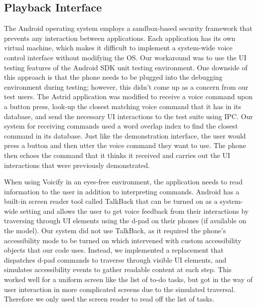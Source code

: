 \documentclass[letterpaper]{article}
\begin{document}
\subsection{Playback Interface}
The Android operating system employs a sandbox-based security framework that prevents any interaction between applications.
Each application has its own virtual machine, which makes it difficult to implement a system-wide voice control interface without modifying the OS.
Our workaround was to use the UI testing features of the Android SDK unit testing environment.
One downside of this approach is that the phone needs to be plugged into the debugging environment during testing; however, 
this didn't come up as a concern from our test users. The Astrid application was modified to receive a voice command upon a button press, look-up the closest matching voice command that it has in its database, and send the necessary UI interactions to the test suite using IPC.
Our system for receiving commands used a word overlap index to find the closest command in its database.
Just like the demonstration interface, the user would press a button and then utter
the voice command they want to use. The phone then echoes the command that it thinks it received and carries out the UI interactions that were
previously demonstrated. 
 
When using Voicify in an eyes-free environment, the application needs to read information to the user in addition to interpreting commands.
Android has a built-in screen reader tool called TalkBack that can be turned on as a system-wide setting and allows the user to get 
voice feedback from their interactions by traversing through UI elements using the d-pad on their phones (if available on the model). 
Our system did not use TalkBack, as it required the phone's accessibility mode to be turned on which intervened with 
custom accessibility objects that our code uses. Instead, we implemented a replacement that dispatches d-pad commands to traverse 
through visible UI elements, and simulates accessibility events to gather readable content at each step. This worked well for a uniform 
screen like the list of to-do tasks, but got in the way of user interaction in more complicated screens due to the simulated traversal. 
Therefore we only used the screen reader to read off the list of tasks.
\end{document}
